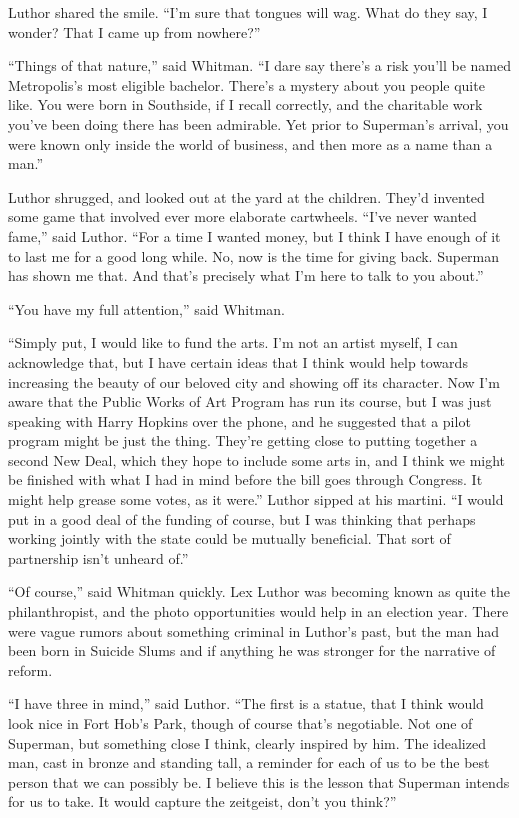 Luthor shared the smile. ``I'm sure that tongues will wag. What do they
say, I wonder? That I came up from nowhere?''

``Things of that nature,'' said Whitman. ``I dare say there's a risk
you'll be named Metropolis's most eligible bachelor. There's a mystery
about you people quite like. You were born in Southside, if I recall
correctly, and the charitable work you've been doing there has been
admirable. Yet prior to Superman's arrival, you were known only inside
the world of business, and then more as a name than a man.''

Luthor shrugged, and looked out at the yard at the children. They'd
invented some game that involved ever more elaborate cartwheels. ``I've
never wanted fame,'' said Luthor. ``For a time I wanted money, but I
think I have enough of it to last me for a good long while. No, now is
the time for giving back. Superman has shown me that. And that's
precisely what I'm here to talk to you about.''

``You have my full attention,'' said Whitman.

``Simply put, I would like to fund the arts. I'm not an artist myself, I
can acknowledge that, but I have certain ideas that I think would help
towards increasing the beauty of our beloved city and showing off its
character. Now I'm aware that the Public Works of Art Program has run
its course, but I was just speaking with Harry Hopkins over the phone,
and he suggested that a pilot program might be just the thing. They're
getting close to putting together a second New Deal, which they hope to
include some arts in, and I think we might be finished with what I had
in mind before the bill goes through Congress. It might help grease some
votes, as it were.'' Luthor sipped at his martini. ``I would put in a
good deal of the funding of course, but I was thinking that perhaps
working jointly with the state could be mutually beneficial. That sort
of partnership isn't unheard of.''

``Of course,'' said Whitman quickly. Lex Luthor was becoming known as
quite the philanthropist, and the photo opportunities would help in an
election year. There were vague rumors about something criminal in
Luthor's past, but the man had been born in Suicide Slums and if
anything he was stronger for the narrative of reform.

``I have three in mind,'' said Luthor. ``The first is a statue, that I
think would look nice in Fort Hob's Park, though of course that's
negotiable. Not one of Superman, but something close I think, clearly
inspired by him. The idealized man, cast in bronze and standing tall, a
reminder for each of us to be the best person that we can possibly be. I
believe this is the lesson that Superman intends for us to take. It
would capture the zeitgeist, don't you think?''

